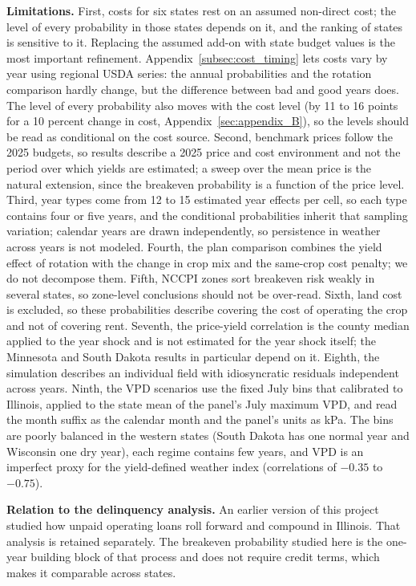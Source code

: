 \documentclass[11pt,letterpaper]{article}
\theoremstyle{remark}
\begin{document}
\textbf{Limitations.} First, costs for six states rest on an assumed non-direct cost; the level of every probability in those states depends on it, and the ranking of states is sensitive to it. Replacing the assumed add-on with state budget values is the most important refinement. Appendix~\ref{subsec:cost_timing} lets costs vary by year using regional USDA series: the annual probabilities and the rotation comparison hardly change, but the difference between bad and good years does. The level of every probability also moves with the cost level (by 11 to 16 points for a 10 percent change in cost, Appendix~\ref{sec:appendix_B}), so the levels should be read as conditional on the cost source. Second, benchmark prices follow the 2025 budgets, so results describe a 2025 price and cost environment and not the period over which yields are estimated; a sweep over the mean price is the natural extension, since the breakeven probability is a function of the price level. Third, year types come from 12 to 15 estimated year effects per cell, so each type contains four or five years, and the conditional probabilities inherit that sampling variation; calendar years are drawn independently, so persistence in weather across years is not modeled. Fourth, the plan comparison combines the yield effect of rotation with the change in crop mix and the same-crop cost penalty; we do not decompose them. Fifth, NCCPI zones sort breakeven risk weakly in several states, so zone-level conclusions should not be over-read. Sixth, land cost is excluded, so these probabilities describe covering the cost of operating the crop and not of covering rent. Seventh, the price-yield correlation is the county median applied to the year shock and is not estimated for the year shock itself; the Minnesota and South Dakota results in particular depend on it. Eighth, the simulation describes an individual field with idiosyncratic residuals independent across years. Ninth, the VPD scenarios use the fixed July bins that \citet{Pizzo2025} calibrated to Illinois, applied to the state mean of the panel's July maximum VPD, and read the month suffix as the calendar month and the panel's units as kPa. The bins are poorly balanced in the western states (South Dakota has one normal year and Wisconsin one dry year), each regime contains few years, and VPD is an imperfect proxy for the yield-defined weather index (correlations of $-0.35$ to $-0.75$).

\textbf{Relation to the delinquency analysis.} An earlier version of this project studied how unpaid operating loans roll forward and compound in Illinois. That analysis is retained separately. The breakeven probability studied here is the one-year building block of that process and does not require credit terms, which makes it comparable across states.
\end{document}

